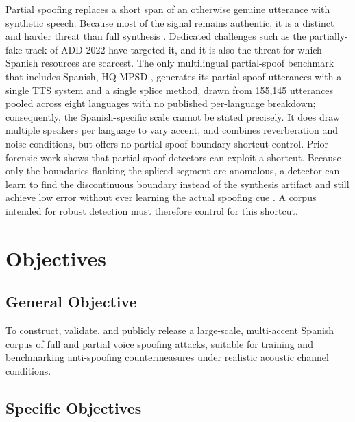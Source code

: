 \documentclass[11pt]{report}
\begin{document}
Partial spoofing replaces a short span of an otherwise
genuine utterance with synthetic speech. Because most of the signal
remains authentic, it is a distinct and harder threat than full synthesis
\citep{zhang2023partialspoof}. Dedicated challenges such as the
partially-fake track of ADD 2022 \citep{add2022} have targeted it, and it
is also the threat for which Spanish resources are scarcest. The only
multilingual partial-spoof benchmark that includes Spanish, HQ-MPSD
\citep{li2025hqmpsd}, generates its partial-spoof utterances with a
single TTS system and a single splice method, drawn from 155,145
utterances pooled across eight languages with no published
per-language breakdown; consequently, the Spanish-specific scale cannot be stated
precisely. It does draw multiple speakers per language to vary accent,
and combines reverberation and noise conditions, but offers no
partial-spoof boundary-shortcut control. Prior forensic work shows that partial-spoof detectors can
exploit a shortcut. Because only the boundaries flanking the spliced
segment are anomalous, a detector can learn to find the discontinuous
boundary instead of the synthesis artifact and still achieve low error
without ever learning the actual spoofing cue
\citep{negroni2024splicing,huang2024detectable}. A corpus intended for
robust detection must therefore control for this shortcut.

\section{Objectives}

\subsection{General Objective}

To construct, validate, and publicly release a large-scale, multi-accent
Spanish corpus of full and partial voice spoofing attacks, suitable for
training and benchmarking anti-spoofing countermeasures under realistic
acoustic channel conditions.

\subsection{Specific Objectives}
\end{document}
